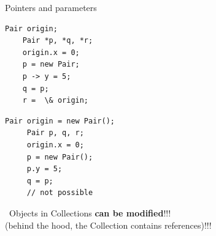 \documentclass[English,c,%
hyperref={%
    pdftitle={FISA-DE2 OOP in Java},%
    pdfauthor={Muller, Gravier, Laforest, Subercaze},%
    pdfsubject={OOP in Java},%
    pdfkeywords={OOP, Java},%
    colorlinks=true,%
    urlcolor=blue,%
    linkcolor=%
    },%
xcolor={pdftex,svgnames} %
]{beamer}
\begin{document}
\begin{frame}[fragile]{Pointers and parameters}

\begin{minipage}[l]{.45\textwidth}
  \begin{lstlisting}[escapechar=\%,label=inCpp,caption=MyCode.cpp]
    Pair origin;
    Pair *p, *q, *r;
    origin.x = 0;
    p = new Pair;
    p -> y = 5;
    q = p;
    r =  \& origin;
   \end{lstlisting}
 \end{minipage}
 \begin{minipage}[l]{.45\textwidth}
   \begin{lstlisting}[escapechar=\%,label=inJava,caption=MyCode.java]
     Pair origin = new Pair();
     Pair p, q, r;
     origin.x = 0;
     p = new Pair();
     p.y = 5;
     q = p;
     // not possible
   \end{lstlisting}
 \end{minipage}

\bigskip
\bigskip

\danger{}~Objects in Collections \textbf{can be modified}!!! \\
(behind the hood, the Collection contains references)!!!

\end{frame}
\end{document}
